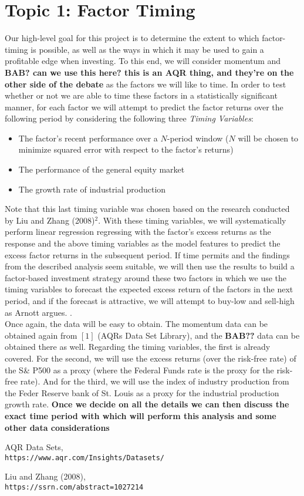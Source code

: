 \documentclass[12pt]{article}
\begin{document}
\section{Topic 1: Factor Timing}

Our high-level goal for this project is to determine the extent to which factor-timing is possible, as well as the ways in which it may be used to gain a profitable edge when investing. To this end, we will consider momentum and \textbf{BAB? can we use this here? this is an AQR thing, and they're on the other side of the debate} as the factors we will like to time. In order to test whether or not we are able to time these factors in a statistically significant manner, for each factor we will attempt to predict the factor returns over the following period by considering the following three \textit{Timing Variables}:
\begin{itemize}
  \item The factor's recent performance over a $N$-period window ($N$ will be chosen to minimize squared error with respect to the factor's returns)
  \item The performance of the general equity market
  \item The growth rate of industrial production
\end{itemize}

Note that this last timing variable was chosen based on the research conducted by Liu and Zhang (2008)$^2$. With these timing variables, we will systematically perform linear regression regressing with the factor's excess returns as the response and the above timing variables as the model features to predict the excess factor returns in the subsequent period. If time permits and the findings from the described analysis seem suitable, we will then use the results to build a factor-based investment strategy around these two factors in which we use the timing variables to forecast the expected excess return of the factors in the next period, and if the forecast is attractive, we will attempt to buy-low and sell-high as Arnott argues. . \\
Once again, the data will be easy to obtain. The momentum data can be obtained again from $[1]$ (AQRs Data Set Library), and the \textbf{BAB??} data can be obtained there as well. Regarding the timing variables, the first is already covered. For the second, we will use the excess returns (over the risk-free rate) of the S\& P500 as a proxy (where the Federal Funds rate is the proxy for the risk-free rate). And for the third, we will use the index of industry production from the Feder Reserve bank of St. Louis as a proxy for the industrial production growth rate. \textbf{Once we decide on all the details we can then discuss the exact time period with which will perform this analysis and some other data considerations}

\begin{thebibliography}{9}
AQR Data Sets,
\\\texttt{https://www.aqr.com/Insights/Datasets/}

Liu and Zhang (2008),
\\\texttt{https://ssrn.com/abstract=1027214}
\end{thebibliography}
\end{document}
